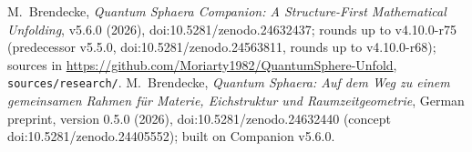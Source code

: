 M.~Brendecke, \emph{Quantum Sphaera Companion: A Structure-First Mathematical
Unfolding}, v5.6.0 (2026), doi:10.5281/zenodo.24632437; rounds up to v4.10.0-r75 (predecessor v5.5.0,
doi:10.5281/zenodo.24563811, rounds up to v4.10.0-r68); sources in
\url{https://github.com/Moriarty1982/QuantumSphere-Unfold}, \texttt{sources/research/}.
M.~Brendecke, \emph{Quantum Sphaera: Auf dem Weg zu einem gemeinsamen Rahmen f\"ur Materie, Eichstruktur und
Raumzeitgeometrie}, German preprint, version 0.5.0 (2026), doi:10.5281/zenodo.24632440 (concept doi:10.5281/zenodo.24405552);
built on Companion v5.6.0.
